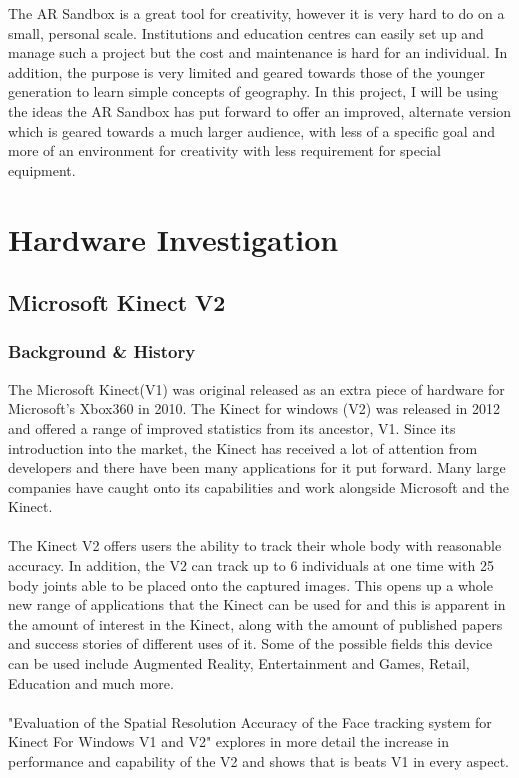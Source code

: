 \documentclass[11pt]{article}
\begin{document}
The AR Sandbox is a great tool for creativity, however it is very hard to do
on a small, personal scale. Institutions and education centres can easily set
up and manage such a project but the cost and maintenance is hard for an
individual. In addition, the purpose is very limited and geared towards those
of the younger generation to learn simple concepts of geography. In this project,
I will be using the ideas the AR Sandbox has put forward to offer an
improved, alternate version which is geared towards a much larger audience, with
less of a specific goal and more of an environment for creativity with less
requirement for special equipment.

\section{Hardware Investigation}
\subsection{Microsoft Kinect V2}
\subsubsection{Background \& History}
The Microsoft Kinect(V1) was original released as an extra piece of hardware
for Microsoft's Xbox360 in 2010. The Kinect for windows (V2) was released
in 2012 and offered a range of improved statistics from its ancestor,
V1. Since its introduction into the market, the Kinect has received a lot of
attention from developers and there have been many applications for it put
forward. Many large companies have caught onto its capabilities and work 
alongside Microsoft and the Kinect.\\ 
\\
The Kinect V2 offers users the ability to track their
whole body with reasonable accuracy. In addition, the V2 can track up to 6 individuals
at one time with 25 body joints able to be placed onto the captured images.
This opens up a whole new range of applications
that the Kinect can be used for and this is apparent in the amount of interest in the
Kinect, along with the amount of published papers and success stories of different
uses of it. Some of the possible fields this device can be used include 
Augmented Reality, Entertainment and Games, Retail, Education and much more.\\
\\ 
"Evaluation of the Spatial Resolution Accuracy of the Face 
tracking system for Kinect For Windows V1 and V2" \cite{AmonFuhrmann14}
explores in more detail the increase in performance and capability
of the V2 and shows that is beats V1 in every aspect. 
\\ \\
\end{document}
